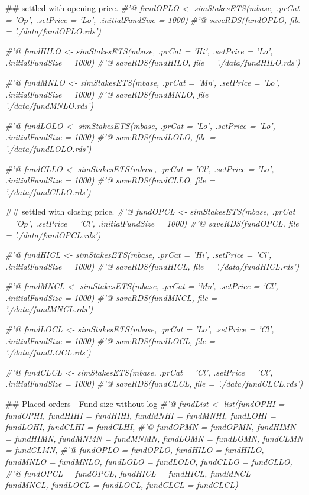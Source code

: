 \documentclass[]{tufte-book}
\newenvironment{Shaded}{}{}
\newcommand{\CommentTok}[1]{\textcolor[rgb]{0.38,0.63,0.69}{\textit{#1}}}
\newcommand{\NormalTok}[1]{#1}
\begin{document}
\begin{Shaded}
\begin{Highlighting}[]
\NormalTok{## settled with opening price.}
\CommentTok{#'@ fundOPLO <- simStakesETS(mbase, .prCat = 'Op', .setPrice = 'Lo', .initialFundSize = 1000)}
\CommentTok{#'@ saveRDS(fundOPLO, file = './data/fundOPLO.rds')}

\CommentTok{#'@ fundHILO <- simStakesETS(mbase, .prCat = 'Hi', .setPrice = 'Lo', .initialFundSize = 1000)}
\CommentTok{#'@ saveRDS(fundHILO, file = './data/fundHILO.rds')}

\CommentTok{#'@ fundMNLO <- simStakesETS(mbase, .prCat = 'Mn', .setPrice = 'Lo', .initialFundSize = 1000)}
\CommentTok{#'@ saveRDS(fundMNLO, file = './data/fundMNLO.rds')}

\CommentTok{#'@ fundLOLO <- simStakesETS(mbase, .prCat = 'Lo', .setPrice = 'Lo', .initialFundSize = 1000)}
\CommentTok{#'@ saveRDS(fundLOLO, file = './data/fundLOLO.rds')}

\CommentTok{#'@ fundCLLO <- simStakesETS(mbase, .prCat = 'Cl', .setPrice = 'Lo', .initialFundSize = 1000)}
\CommentTok{#'@ saveRDS(fundCLLO, file = './data/fundCLLO.rds')}


\NormalTok{## settled with closing price.}
\CommentTok{#'@ fundOPCL <- simStakesETS(mbase, .prCat = 'Op', .setPrice = 'Cl', .initialFundSize = 1000)}
\CommentTok{#'@ saveRDS(fundOPCL, file = './data/fundOPCL.rds')}

\CommentTok{#'@ fundHICL <- simStakesETS(mbase, .prCat = 'Hi', .setPrice = 'Cl', .initialFundSize = 1000)}
\CommentTok{#'@ saveRDS(fundHICL, file = './data/fundHICL.rds')}

\CommentTok{#'@ fundMNCL <- simStakesETS(mbase, .prCat = 'Mn', .setPrice = 'Cl', .initialFundSize = 1000)}
\CommentTok{#'@ saveRDS(fundMNCL, file = './data/fundMNCL.rds')}

\CommentTok{#'@ fundLOCL <- simStakesETS(mbase, .prCat = 'Lo', .setPrice = 'Cl', .initialFundSize = 1000)}
\CommentTok{#'@ saveRDS(fundLOCL, file = './data/fundLOCL.rds')}

\CommentTok{#'@ fundCLCL <- simStakesETS(mbase, .prCat = 'Cl', .setPrice = 'Cl', .initialFundSize = 1000)}
\CommentTok{#'@ saveRDS(fundCLCL, file = './data/fundCLCL.rds')}

\NormalTok{## Placed orders - Fund size without log}
\CommentTok{#'@ fundList <- list(fundOPHI = fundOPHI, fundHIHI = fundHIHI, fundMNHI = fundMNHI, fundLOHI = fundLOHI, fundCLHI = fundCLHI, }
\CommentTok{#'@                 fundOPMN = fundOPMN, fundHIMN = fundHIMN, fundMNMN = fundMNMN, fundLOMN = fundLOMN, fundCLMN = fundCLMN, }
\CommentTok{#'@                 fundOPLO = fundOPLO, fundHILO = fundHILO, fundMNLO = fundMNLO, fundLOLO = fundLOLO, fundCLLO = fundCLLO, }
\CommentTok{#'@                 fundOPCL = fundOPCL, fundHICL = fundHICL, fundMNCL = fundMNCL, fundLOCL = fundLOCL, fundCLCL = fundCLCL)}


\end{Highlighting}
\end{Shaded}
\end{document}
